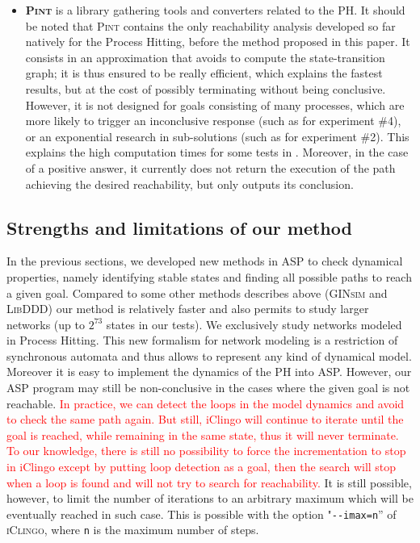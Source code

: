\begin{itemize}
\item \textbf{\textsc{Pint}}
is a library gathering tools and converters related to the PH.
It should be noted that \textsc{Pint} contains the only reachability analysis
developed so far natively for the Process Hitting,
before the method proposed in this paper.
It consists in an approximation that avoids to compute the state-transition graph;
it is thus ensured to be really efficient, which explains the fastest results,
but at the cost of possibly terminating without being conclusive.
However, it is not designed for goals consisting of many processes,
which are more likely to trigger an inconclusive response
(such as for experiment \#4),
or an exponential research in sub-solutions
(such as for experiment \#2).
This explains the high computation times for some tests in .
Moreover, in the case of a positive answer,
it currently does not return the execution of the path achieving the desired reachability,
but only outputs its conclusion.
\end{itemize}

\subsection{Strengths and limitations of our method}
\label{sec:limitations}

In the previous sections,
we developed new methods in ASP to check dynamical properties,
namely identifying stable states and finding all possible paths to reach a given goal.
Compared to some other methods describes above
(\textsc{GINsim} and \textsc{LibDDD}) our method is relatively faster and also permits to study larger networks
(up to $2^{73}$ states in our tests). We exclusively study networks modeled in Process Hitting. This new formalism for network modeling is a restriction of synchronous automata and thus allows to represent any kind of dynamical model. Moreover it is easy to implement the dynamics of the PH into ASP.
However, our ASP program may still be non-conclusive
in the cases where the given goal is not
reachable.
\textcolor{red}{In practice, we can detect the loops in the model dynamics and avoid to check the same path again.
But still, iClingo will continue to iterate until the goal is reached, while remaining in the same state, thus it will never terminate.
To our knowledge, there is still no possibility to force the incrementation to stop in iClingo except by putting loop detection as a goal,
then the search will stop when a loop is found and will not try to search for reachability.}
It is still possible, however, to limit the number of iterations to an arbitrary
maximum which will be eventually reached in such case. %
This is possible with the option "\texttt{-{}-imax=n}'' of \textsc{iClingo},
where \texttt{n} is the maximum number of steps.

